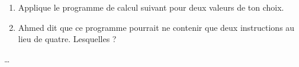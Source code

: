 \begin{exercice*}
    \begin{enumerate}
        \item Applique le programme de calcul suivant pour deux valeurs de ton choix.
        \item Ahmed dit que ce programme pourrait ne contenir que deux instructions au lieu de quatre. Lesquelles ?
    \end{enumerate}
\end{exercice*}
\begin{corrige}
    \dots
\end{corrige}

